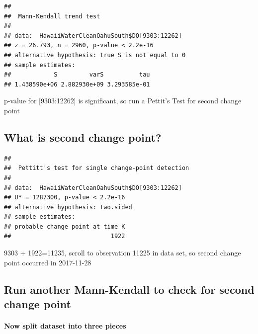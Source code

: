 \documentclass[12pt,]{article}
\newenvironment{Shaded}{\begin{snugshade}}{\end{snugshade}}
\newcommand{\KeywordTok}[1]{\textcolor[rgb]{0.13,0.29,0.53}{\textbf{#1}}}
\newcommand{\DecValTok}[1]{\textcolor[rgb]{0.00,0.00,0.81}{#1}}
\newcommand{\OperatorTok}[1]{\textcolor[rgb]{0.81,0.36,0.00}{\textbf{#1}}}
\newcommand{\NormalTok}[1]{#1}
\let\oldparagraph\paragraph
\renewcommand{\paragraph}[1]{\oldparagraph{#1}\mbox{}}
\begin{document}
\begin{verbatim}
## 
##  Mann-Kendall trend test
## 
## data:  HawaiiWaterCleanOahuSouth$DO[9303:12262]
## z = 26.793, n = 2960, p-value < 2.2e-16
## alternative hypothesis: true S is not equal to 0
## sample estimates:
##            S         varS          tau 
## 1.438590e+06 2.882930e+09 3.293585e-01
\end{verbatim}

p-value for {[}9303:12262{]} is significant, so run a Pettit's Test for
second change point

\subsection{What is second change
point?}\label{what-is-second-change-point}

\begin{Shaded}
\end{Shaded}

\begin{verbatim}
## 
##  Pettitt's test for single change-point detection
## 
## data:  HawaiiWaterCleanOahuSouth$DO[9303:12262]
## U* = 1287300, p-value < 2.2e-16
## alternative hypothesis: two.sided
## sample estimates:
## probable change point at time K 
##                            1922
\end{verbatim}

9303 + 1922=11235, scroll to observation 11225 in data set, so second
change point occurred in 2017-11-28

\subsection{Run another Mann-Kendall to check for second change
point}\label{run-another-mann-kendall-to-check-for-second-change-point}

\paragraph{Now split dataset into three
pieces}\label{now-split-dataset-into-three-pieces-1}

\begin{Shaded}
\end{Shaded}
\end{document}
